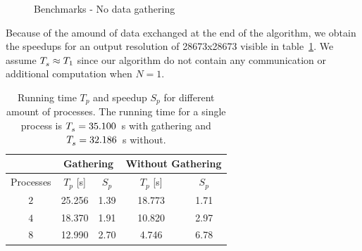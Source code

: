 \begin{figure}[!htb]
    \caption{Benchmarks - No data gathering}
    \label{fig:benchmarks2_ds}
\endminipage\hfill
\end{figure}

\pagebreak

Because of the amound of data exchanged at the end of the algorithm, we obtain the speedups for an output resolution of 28673x28673 visible in table~\ref{table:speedup}. We assume $T^{\*}_s \approx T_1$ since our algorithm do not contain any communication or additional computation when $N = 1$.

\begin{table}[H]
\begin{center}
\begin{tabular}{c|c|c|c|c|}
 & \multicolumn{2}{c|}{Gathering} & \multicolumn{2}{c|}{Without Gathering} \\
\hline
Processes & $T_p$ [s] & $S_p$ & $T_p$ [s] & $S_p$ \\

\hline
$2$ & 25.256 & 1.39 & 18.773 & 1.71 \\
$4$ & 18.370 & 1.91 & 10.820 & 2.97\\
$8$ & 12.990 & 2.70 & 4.746 & 6.78\\
\hline
\end{tabular}
\caption{\label{table:speedup} Running time $T_p$ and speedup $S_p$ for different amount of processes. The running time for a single process is $T^{\*}_s = 35.100$~s with gathering and $T^{\*}_s = 32.186$~s without.}
\end{center}
\end{table}



